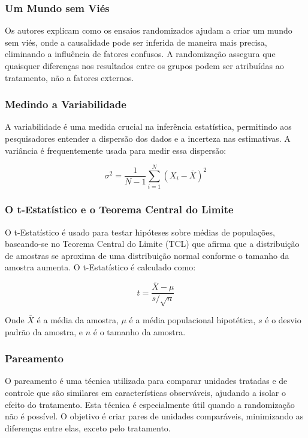 \documentclass[a4paper,12pt]{article}[abntex2]
\begin{document}
\subsubsection*{Um Mundo sem Viés}

Os autores explicam como os ensaios randomizados ajudam a criar um mundo sem viés, onde a causalidade pode ser inferida de maneira mais precisa, eliminando a influência de fatores confusos. A randomização assegura que quaisquer diferenças nos resultados entre os grupos podem ser atribuídas ao tratamento, não a fatores externos.

\subsubsection*{Medindo a Variabilidade}

A variabilidade é uma medida crucial na inferência estatística, permitindo aos pesquisadores entender a dispersão dos dados e a incerteza nas estimativas. A variância é frequentemente usada para medir essa dispersão:

\begin{equation}
    \sigma^2 = \frac{1}{N-1} \sum_{i=1}^{N} (X_i - \bar{X})^2
\end{equation}

\subsubsection*{O t-Estatístico e o Teorema Central do Limite}

O t-Estatístico é usado para testar hipóteses sobre médias de populações, baseando-se no Teorema Central do Limite (TCL) que afirma que a distribuição de amostras se aproxima de uma distribuição normal conforme o tamanho da amostra aumenta. O t-Estatístico é calculado como:

\begin{equation}
    t = \frac{\bar{X} - \mu}{s / \sqrt{n}}
\end{equation}

Onde \(\bar{X}\) é a média da amostra, \(\mu\) é a média populacional hipotética, \(s\) é o desvio padrão da amostra, e \(n\) é o tamanho da amostra.

\subsubsection*{Pareamento}

O pareamento é uma técnica utilizada para comparar unidades tratadas e de controle que são similares em características observáveis, ajudando a isolar o efeito do tratamento. Esta técnica é especialmente útil quando a randomização não é possível. O objetivo é criar pares de unidades comparáveis, minimizando as diferenças entre elas, exceto pelo tratamento.
\end{document}
